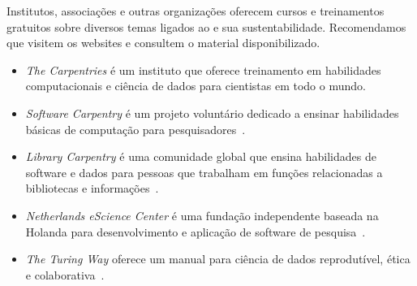 Institutos, associações e outras organizações oferecem cursos e treinamentos gratuitos sobre diversos temas ligados ao \RSw e sua sustentabilidade. Recomendamos que visitem os websites e consultem o material disponibilizado.
\begin{itemize}
    \item \textit{The Carpentries}
    é um instituto que oferece treinamento em habilidades computacionais e ciência de dados para cientistas em todo o mundo.
    \item \textit{Software Carpentry} é um projeto voluntário dedicado a ensinar habilidades básicas de computação para pesquisadores~\cite{madicken_munk_2019_3264950, aleksandra_nenadic_2022_6532057}.
    \item \textit{Library Carpentry} é uma comunidade global que ensina habilidades de software e dados para pessoas que trabalham em funções relacionadas a bibliotecas e informações~\cite{madicken_munk_2019_3264950}.
    \item \textit{Netherlands eScience Center} é uma fundação independente baseada na Holanda para desenvolvimento e aplicação de software de pesquisa~\cite{drost_niels_2020_4020622}. 
    \item \textit{The Turing Way} oferece um manual para ciência de dados reprodutível, ética e colaborativa~\cite{the_turing_way_community_2022_7625728}.
\end{itemize}



